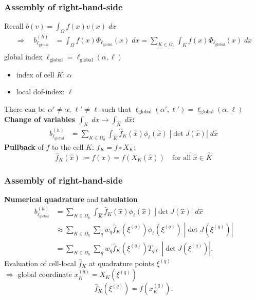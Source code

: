 \documentclass{beamer}
\begin{document}

\begin{frame}
  \frametitle{Assembly of right-hand-side}
  Recall $b(v) = \int_\Omega f(x)v(x)\;dx$ 
  $$
\begin{aligned}
\Rightarrow \quad b^{(h)}_{\ell_{\text{global}}} &= \int_\Omega f(x) \Phi_{\ell_{\text{global}}}(x)\;dx = \sum_{K\in \Omega_h} \int_K f(x) \Phi_{\ell_{\text{global}}}(x) \; dx\\
\end{aligned}
$$
global index $\ell_{\text{global}}=\ell_{\text{global}}(\alpha,\ell)$
\begin{itemize}
  \item index of cell $K$: $\alpha$
  \item local dof-index: $\ell$
\end{itemize}
{\footnotesize There can be $\alpha'\neq \alpha$, $\ell'\neq\ell$ such that $\ell_{\text{global}}(\alpha',\ell')=\ell_{\text{global}}(\alpha,\ell)$}\\[1ex]
\textbf{Change of variables $\int_{K}\;dx\rightarrow\int_{\widehat{K}}\;d\widehat{x}$:} 
$$
\begin{aligned}
b^{(h)}_{\ell_{\text{global}}} &= \sum_{K\in \Omega_h}\int_{\widehat{K}} \widehat{f}_K(\widehat{x}) \phi_\ell(\widehat{x})\;|\det{J}(\widehat{x})|\;d\widehat{x}
\end{aligned}
$$
\textbf{Pullback} of $f$ to the cell $K$: $\widehat{f}_K = f\circ X_K$:
$$
\widehat{f}_K(\widehat{x}) :=  f(x) = f(X_K(\widehat{x}))
\quad \text{for all $\widehat{x}\in\widehat{K}$}
$$
\end{frame}


\begin{frame}
  \frametitle{Assembly of right-hand-side}
  \textbf{Numerical quadrature} and \textbf{tabulation}
$$
\begin{aligned}
b^{(h)}_{\ell_{\text{global}}} &=\sum_{K\in \Omega_h}\int_{\widehat{K}} \widehat{f}_K(\widehat{x}) \phi_\ell(\widehat{x})\;|\det{J}(\widehat{x})|\;d\widehat{x}\\
&\approx \sum_{K\in \Omega_h} \sum_q w_q \widehat{f}_K(\xi^{(q)}) \phi_\ell(\xi^{(q)})\;|\det{J}(\xi^{(q)})|\\
&= \sum_{K\in \Omega_h} \sum_q w_q \widehat{f}_K(\xi^{(q)}) T_{q\ell}\;|\det{J}(\xi^{(q)})|.
\end{aligned}
$$
Evaluation of cell-local $\widehat{f}_K$ at quadrature points $\xi^{(q)}$\\
$\Rightarrow$ global coordinate $x_K^{(q)}=X_K(\xi^{(q)})$
$$
\widehat{f}_K(\xi^{(q)}) = f(x_K^{(q)}).
$$
\end{frame}
\end{document}
